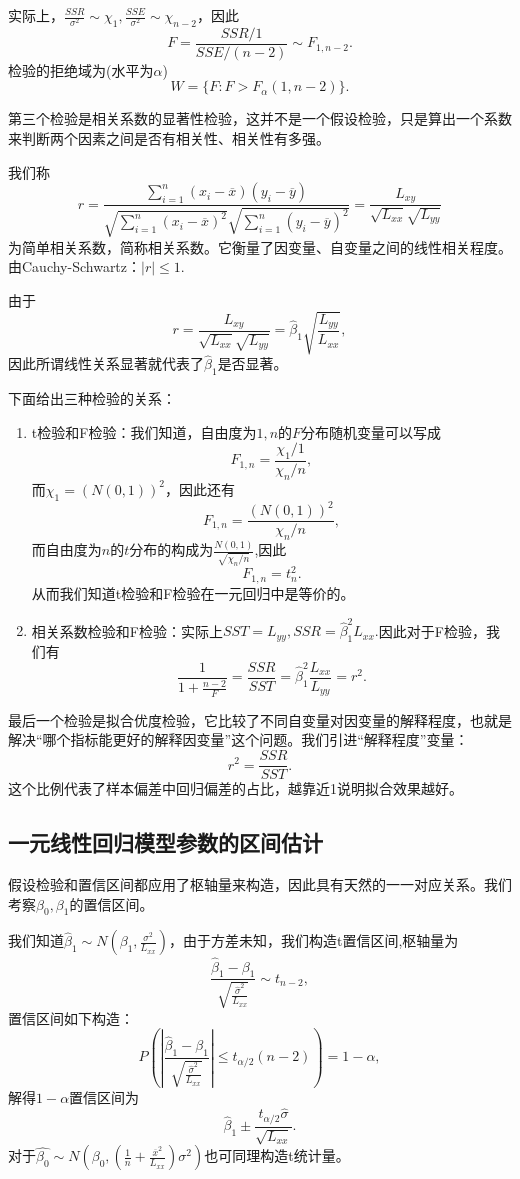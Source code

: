 \documentclass[lang=cn,10pt]{elegantbook}
\begin{document}
    实际上，\(\frac{SSR}{\sigma^2}\sim \chi_1,\frac{SSE}{\sigma^2}\sim \chi_{n-2}\)，因此
    \[F=\frac{SSR/1}{SSE/(n-2)}\sim F_{1,n-2}.\]
    检验的拒绝域为(水平为\(\alpha\))
    \[W=\{F:F>F_{\alpha}(1,n-2)\}.\]

    第三个检验是相关系数的显著性检验，这并不是一个假设检验，只是算出一个系数来判断两个因素之间是否有相关性、相关性有多强。

    我们称
    \[r=\frac{\sum_{i=1}^{n}(x_i-\overline{x})(y_i-\overline{y})}{\sqrt{\sum_{i=1}^{n}(x_i-\overline{x})^2}\sqrt{\sum_{i=1}^{n}(y_i-\overline{y})^2}}=\frac{L_{xy}}{\sqrt{L_{xx}}\sqrt{L_{yy}}}\]
    为简单相关系数，简称相关系数。它衡量了因变量、自变量之间的线性相关程度。由Cauchy-Schwartz：\(|r|\le1.\)

    由于\[r=\frac{L_{xy}}{\sqrt{L_{xx}}\sqrt{L_{yy}}}=\hat{\beta}_1\sqrt{\frac{L_{yy}}{L_{xx}}},\]因此所谓线性关系显著就代表了\(\hat{\beta}_1\)是否显著。

    下面给出三种检验的关系：
    \begin{enumerate}
        \item t检验和F检验：我们知道，自由度为\(1,n\)的\(F\)分布随机变量可以写成\[F_{1,n}=\frac{\chi_1/1}{\chi_n/n},\]而\(\chi_1=(N(0,1))^2\)，因此还有\[F_{1,n}=\frac{(N(0,1))^2}{\chi_n/n},\]而自由度为\(n\)的\(t\)分布的构成为\(\frac{N(0,1)}{\sqrt{\chi_n/n}}\),因此\[F_{1,n}=t_n^2.\]从而我们知道t检验和F检验在一元回归中是等价的。
        \item 相关系数检验和F检验：实际上\(SST=L_{yy},SSR=\hat{\beta}_1^2L_{xx}.\)因此对于F检验，我们有\[\frac{1}{1+\frac{n-2}{F}}=\frac{SSR}{SST}=\hat{\beta}_1^2\frac{L_{xx}}{L_{yy}}=r^2.\]
    \end{enumerate}

    最后一个检验是拟合优度检验，它比较了不同自变量对因变量的解释程度，也就是解决“哪个指标能更好的解释因变量”这个问题。我们引进“解释程度”变量：
    \[r^2=\frac{SSR}{SST}.\]
    这个比例代表了样本偏差中回归偏差的占比，越靠近1说明拟合效果越好。

    \subsection{一元线性回归模型参数的区间估计}
     假设检验和置信区间都应用了枢轴量来构造，因此具有天然的一一对应关系。我们考察\(\beta_0,\beta_1\)的置信区间。

     我们知道\(\hat{\beta}_1\sim N(\beta_1,\frac{\sigma^2}{L_{xx}})\)，由于方差未知，我们构造t置信区间,枢轴量为
     \[\frac{\hat{\beta}_1-\beta_1}{\sqrt{\frac{\hat{\sigma}^2}{L_{xx}}}}\sim t_{n-2},\]
     置信区间如下构造：
     \[P(|\frac{\hat{\beta}_1-\beta_1}{\sqrt{\frac{\hat{\sigma}^2}{L_{xx}}}}|\le t_{\alpha/2}(n-2))=1-\alpha,\]
     解得\(1-\alpha\)置信区间为
     \[\hat{\beta}_1\pm \frac{t_{\alpha/2}\hat{\sigma}}{\sqrt{L_{xx}}}.\]
    对于\(\hat{\beta_0}\sim N(\beta_0,(\frac{1}{n}+\frac{\overline{x}^2}{L_{xx}})\sigma^2)\)也可同理构造t统计量。
\end{document}
